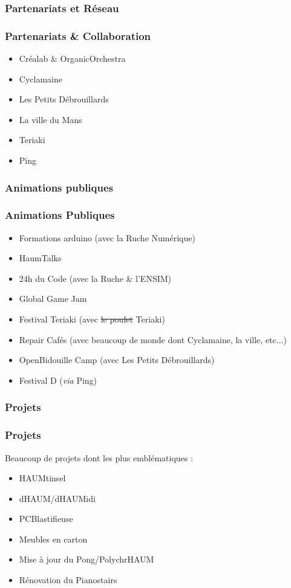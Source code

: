 \documentclass[10pt, compress]{beamer}
\begin{document}


\subsubsection{Partenariats et Réseau}
\begin{frame}
	\frametitle{Partenariats \& Collaboration}

	\begin{itemize}
		\item Créalab \& OrganicOrchestra
		\item Cyclamaine
		\item Les Petits Débrouillards
		\item La ville du Mans
		\item Teriaki
		\item Ping
	\end{itemize}
\end{frame}


\subsubsection{Animations publiques}


\begin{frame}
	\frametitle{Animations Publiques}

	\begin{itemize}
		\item Formations arduino (avec la Ruche Numérique)
		\item HaumTalks
		\item 24h du Code (avec la Ruche \& l'ENSIM)
		\item Global Game Jam
		\item Festival Teriaki (avec \sout{le poulet} Teriaki)
		\item Repair Cafés (avec beaucoup de monde dont Cyclamaine, la ville, etc...)
		\item OpenBidouille Camp (avec Les Petits Débrouillards)
		\item Festival D (\textit{via} Ping)
	\end{itemize}
\end{frame}

\subsubsection{Projets}

\begin{frame}

	\frametitle{Projets}

	Beaucoup de projets dont les plus emblématiques :

	\begin{itemize}
		\item HAUMtinsel
		\item dHAUM/dHAUMidi
		\item PCBlastifieuse
		\item Meubles en carton
		\item Mise à jour du Pong/PolychrHAUM
		\item Rénovation du Pianostairs
	\end{itemize}
\end{frame}
\end{document}
